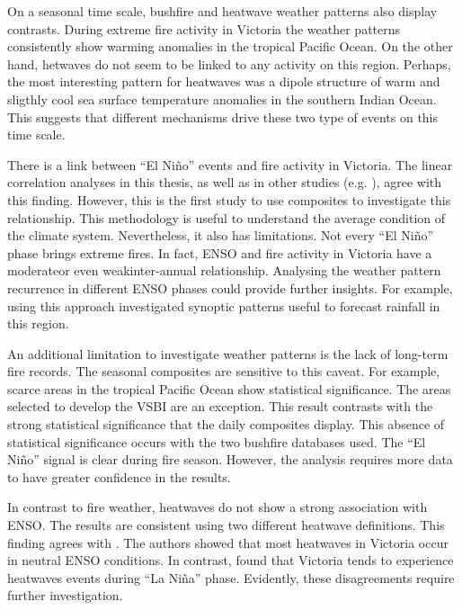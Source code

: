 On a seasonal time scale, bushfire and heatwave weather patterns also
display contrasts. During extreme fire activity in Victoria the weather
patterns consistently show warming anomalies in the tropical Pacific
Ocean. On the other hand, hetwaves do not seem to be linked to any
activity on this region. Perhaps, the most interesting pattern for
heatwaves was a dipole structure of warm and sligthly cool sea surface
temperature anomalies in the southern Indian Ocean. This suggests
that different mechanisms drive these two type of events on this time
scale. 

There is a link between \textquotedblleft El Ni\~no\textquotedblright{}
events and fire activity in Victoria. The linear correlation analyses
in this thesis, as well as in other studies (e.g. \citet{Harris2013}),
agree with this finding. However, this is the first study to use composites
to investigate this relationship. This methodology is useful to understand
the average condition of the climate system. Nevertheless, it also
has limitations. Not every \textquotedblleft El Ni\~no\textquotedblright{}
phase brings extreme fires. In fact, ENSO and fire activity in Victoria
have a moderate\textemdash or even weak\textemdash inter-annual relationship.
Analysing the weather pattern recurrence in different ENSO phases
could provide further insights. For example, using this approach \citet{Verdon-Kidd2008a}
investigated synoptic patterns useful to forecast rainfall in this
region. 

An additional limitation to investigate weather patterns is the lack
of long-term fire records. The seasonal composites are sensitive to
this caveat. For example, scarce areas in the tropical Pacific Ocean
show statistical significance. The areas selected to develop the VSBI
are an exception. This result contrasts with the strong statistical
significance that the daily composites display. This absence of statistical
significance occurs with the two bushfire databases used. The \textquotedblleft El
Ni\~no\textquotedblright{} signal is clear during fire season. However,
the analysis requires more data to have greater confidence in the
results. 

In contrast to fire weather, heatwaves do not show a strong association
with ENSO. The results are consistent using two different heatwave
definitions. This finding agrees with \citet{Boschat2014}. The authors
showed that most heatwaves in Victoria occur in neutral ENSO conditions\textemdash .
In contrast, \citet{Parker2014} found that Victoria tends to experience
heatwaves events during \textquotedblleft La Ni\~na\textquotedblright{}
phase. Evidently, these disagreements require further investigation.

